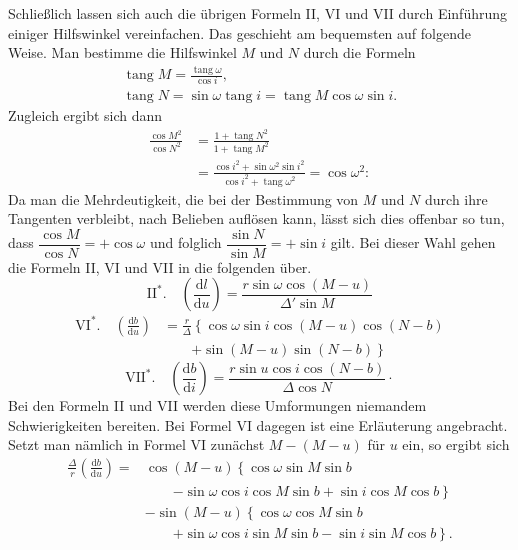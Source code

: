 Schließlich lassen sich auch die übrigen Formeln II, VI und VII durch Einführung einiger Hilfswinkel vereinfachen. Das geschieht am bequemsten auf folgende Weise. Man bestimme die Hilfswinkel $M$ und $N$ durch die Formeln
\[
\begin{gathered}
\operatorname{tang}M = \frac{\operatorname{tang}\omega}{\cos i},\\
\operatorname{tang}N = \sin\omega\operatorname{tang}i = \operatorname{tang}M\cos\omega\sin i.
\end{gathered}
\]
\noindent Zugleich ergibt sich dann
\[
\begin{aligned}
\frac{\cos M^2}{\cos N^2}&=\frac{1+\operatorname{tang}N^2}{1+\operatorname{tang}M^2}\\
&=\frac{\cos i^2+\sin\omega^2\sin i^2}{\cos i^2+\operatorname{tang}\omega^2}=\cos\omega^2:
\end{aligned}
\]
\noindent Da man die Mehrdeutigkeit, die bei der Bestimmung von $M$ und $N$ durch ihre Tangenten verbleibt, nach Belieben auflösen kann, lässt sich dies offenbar so tun, dass $\dfrac{\cos M}{\cos N}=+\cos\omega$ und folglich $\dfrac{\sin N}{\sin M}=+\sin i$ gilt. Bei dieser Wahl gehen die Formeln II, VI und VII in die folgenden über.
\[
\mathrm{II}^{*}.\quad \left(\frac{\mathrm{d}l}{\mathrm{d}u}\right) = \frac{r\sin\omega\cos(M-u)}{\Delta'\sin M}
\]
\[
\begin{aligned}
\mathrm{VI}^{*}.\quad \left(\frac{\mathrm{d}b}{\mathrm{d}u}\right)&=\frac{r}{\Delta}\left\{\cos\omega\sin i\cos(M-u)\cos(N-b)\right.\\
&\qquad\left.+\sin(M-u)\sin(N-b)\right\}
\end{aligned}
\]
\[
\mathrm{VII}^{*}.\quad \left(\frac{\mathrm{d}b}{\mathrm{d}i}\right) = \frac{r\sin u\cos i\cos(N-b)}{\Delta\cos N}\mathpunct{\cdot}
\]
\noindent Bei den Formeln II und VII werden diese Umformungen niemandem Schwierigkeiten bereiten. Bei Formel VI dagegen ist eine Erläuterung angebracht. Setzt man nämlich in Formel VI zunächst $M-(M-u)$ für $u$ ein, so ergibt sich
\[
\begin{aligned}
\frac{\Delta}{r}\left(\frac{\mathrm{d}b}{\mathrm{d}u}\right) = {}&\cos(M-u)\left\{\cos\omega\sin M\sin b\right.\\
&\qquad\left.-\sin\omega\cos i\cos M\sin b+\sin i\cos M\cos b\right\}\\
&-\sin(M-u)\left\{\cos\omega\cos M\sin b\right.\\
&\qquad\left.+\sin\omega\cos i\sin M\sin b-\sin i\sin M\cos b\right\}.
\end{aligned}
\]

